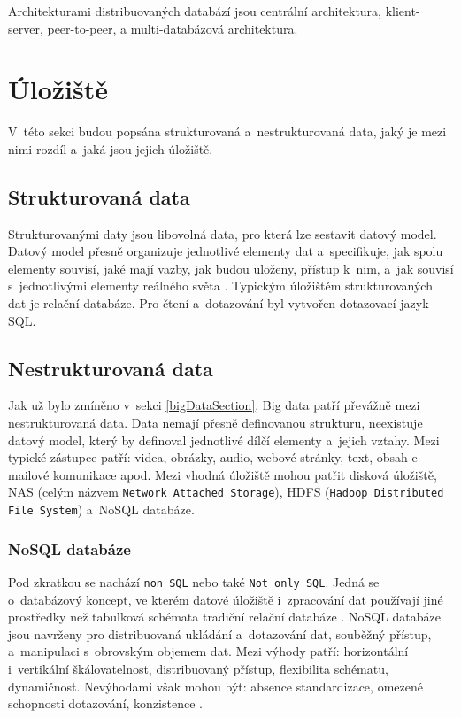 \vspace{0.5cm}
\noindent Architekturami distribuovaných databází jsou centrální architektura, klient-server, peer-to-peer, a multi-databázová architektura.

\section{Úložiště}
V~této sekci budou popsána strukturovaná a~nestrukturovaná data, jaký je mezi nimi rozdíl a~jaká jsou jejich úložiště.

\subsection{Strukturovaná data}
Strukturovanými daty jsou libovolná data, pro která lze sestavit datový model. Datový model přesně organizuje jednotlivé elementy dat a~specifikuje, jak spolu elementy souvisí, jaké mají vazby, jak budou uloženy, přístup k~nim, a~jak souvisí s~jednotlivými elementy reálného světa \cite{structData}. Typickým úložištěm strukturovaných dat je relační databáze. Pro čtení a~dotazování byl vytvořen dotazovací jazyk SQL.

\subsection{Nestrukturovaná data}
Jak už bylo zmíněno v~sekci \ref{bigDataSection}, Big data patří převážně mezi nestrukturovaná data. Data nemají přesně definovanou strukturu, neexistuje datový model, který by definoval jednotlivé dílčí elementy a~jejich vztahy. Mezi typické zástupce patří: videa, obrázky, audio, webové stránky, text, obsah e-mailové komunikace apod. Mezi vhodná úložiště mohou patřit disková úložiště, NAS (celým názvem \texttt{Network Attached Storage}), HDFS (\texttt{Hadoop Distributed File System}) a~NoSQL databáze.

\subsubsection{NoSQL databáze}
Pod zkratkou se nachází \texttt{non SQL} nebo také \texttt{Not only SQL}. Jedná se o~databázový koncept, ve kterém datové úložiště i~zpracování dat používají jiné prostředky než tabulková schémata tradiční relační databáze \cite{noSqlWiki}. NoSQL databáze jsou navrženy pro distribuovaná ukládání a~dotazování dat, souběžný přístup, a~manipulaci s~obrovským objemem dat. Mezi výhody patří: horizontální i~vertikální škálovatelnost, distribuovaný přístup, flexibilita schématu, dynamičnost. Nevýhodami však mohou být: absence standardizace, omezené schopnosti dotazování, konzistence \cite{noSqlIntro}.

